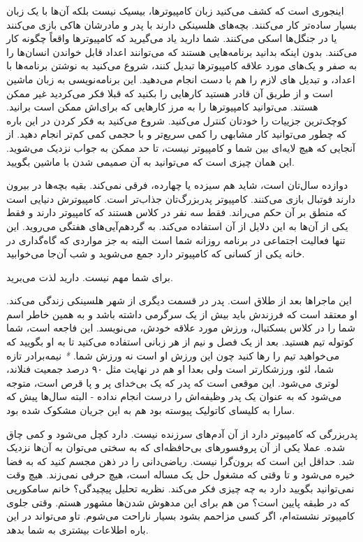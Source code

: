 اینجوری است که کشف می‌کنید زبان کامپیوترها، بیسیک نیست بلکه آن‌ها با یک
زبان بسیار ساده‌تر کار می‌کنند. بچه‌های هلسینکی دارند با پدر و مادرشان
هاکی بازی می‌کنند یا در جنگل‌ها اسکی می‌کنند. شما دارید یاد می‌گیرید که
کامپیوترها واقعاً چگونه کار می‌کنند. بدون اینکه بدانید برنامه‌هایی هستند
که می‌توانند اعداد قابل خواندن انسان‌ها را به صفر و یک‌های مورد علاقه
کامپیوترها تبدیل کنند، شروع می‌کنید به نوشتن برنامه‌ها با اعداد، و تبدیل
های لازم را هم با دست انجام می‌دهید. این برنامه‌نویسی به زبان ماشین است
و از طریق آن قادر هستید کارهایی را بکنید که قبلا فکر می‌کردید غیر ممکن
هستند. می‌توانید کامپیوترها را به مرز کارهایی که برای‌اش ممکن است
برانید. کوچک‌ترین جزییات را خودتان کنترل می‌کنید. شروع می‌کنید به فکر
کردن در این باره که چطور می‌توانید کار مشابهی را کمی سریع‌تر و با حجمی‌
کمی‌ کم‌تر انجام دهید. از آنجایی که هیچ لایه‌ای بین شما و کامپیوتر نیست،
تا حد ممکن به جواب نزدیک می‌شوید. این همان چیزی است که می‌توانید به آن
صمیمی شدن با ماشین بگویید.

دوازده‌ سال‌تان است، شاید هم سیزده یا چهارده، فرقی نمی‌کند. بقیه بچه‌ها در
بیرون دارند فوتبال بازی می‌کنند. کامپیوتر پدربزرگ‌تان جذاب‌تر
است. کامپیوترش دنیایی است که منطق بر آن حکم می‌راند. فقط سه نفر در کلاس
هستند که کامپیوتر دارند و فقط یکی از آن‌ها به این دلایل از آن استفاده
می‌کند. به گردهم‌آیی‌های هفتگی می‌روید. این تنها فعالیت اجتماعی در برنامه
روزانه‌ شما است البته به جز مواردی که گاه‌گداری در خانه یکی از کسانی که
کامپیوتر دارد جمع می‌شوید و شب آن‌جا می‌خوابید.

برای شما مهم نیست. دارید لذت می‌برید.

این ماجراها بعد از طلاق است. پدر در قسمت دیگری از شهر هلسینکی زندگی
می‌کند. او معتقد است که فرزندش باید بیش از یک سرگرمی داشته باشد و به
همین خاطر اسم شما را در کلاس بسکتبال،‌ ورزش مورد علاقه خودش،
می‌نویسد. این فاجعه است،‌ شما کوتوله تیم هستید. بعد از یک فصل و نیم از
هر زبانی استفاده می‌کنید تا به او بگویید که می‌خواهید تیم را رها کنید
چون این ورزش او است نه ورزش شما. \emph{*} نیمه‌برادر تازه شما، لئو،
ورزشکارتر است ولی بعدا او هم در نهایت مثل ۹۰ درصد جمعیت فنلاند،
لوتری می‌شود. این
موقعی است که پدر که یک بی‌خدای پر و پا قرص است، متوجه می‌شود که به عنوان
یک پدر وظیفه‌اش را درست انجام نداده - البته سال‌ها پیش که سارا به کلیسای
کاتولیک پیوسته بود هم به این جریان مشکوک شده بود.

پدربزرگی که کامپیوتر دارد از آن آدم‌های سرزنده نیست. دارد کچل می‌شود و
کمی چاق شده. عملا یکی از آن پروفسورهای بی‌حافظه‌ای که به سختی می‌توان به
آن‌ها نزدیک شد. حداقل این است که برون‌گرا نیست. ریاضی‌دانی را در ذهن مجسم
کنید که به فضا خیره می‌شود و تا وقتی که مشغول حل یک مساله است، هیچ حرفی
نمی‌زند. هیچ وقت نمی‌توانید بگویید دارد به چه چیزی فکر می‌کند. نظریه
تحلیل پیچیدگی؟ خانم سامکورپی که
در طبقه پایین است؟ من هم برای این مدهوش شدن‌ها مشهور هستم. وقتی جلوی
کامپیوتر نشسته‌ام، اگر کسی مزاحمم بشود بسیار ناراحت می‌شوم. تاو می‌تواند
در این باره اطلاعات بیشتری به شما بدهد.

